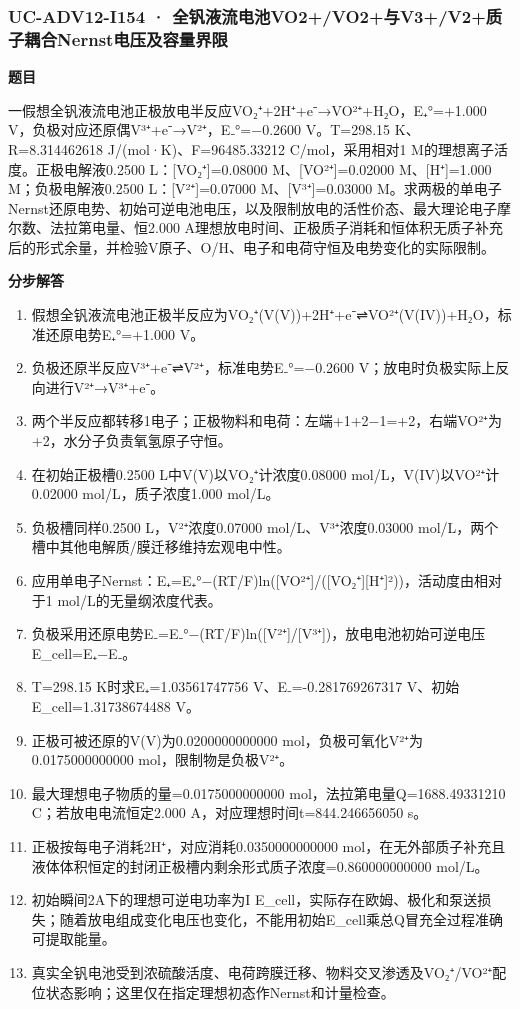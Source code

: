\documentclass[UTF8,11pt,a4paper]{ctexart}
\begin{document}
\subsubsection*{UC-ADV12-I154 · 全钒液流电池VO2+/VO2+与V3+/V2+质子耦合Nernst电压及容量界限}
\noindent\textbf{题目}\par
一假想全钒液流电池正极放电半反应VO₂⁺+2H⁺+e⁻→VO²⁺+H₂O，E₊°=+1.000 V，负极对应还原偶V³⁺+e⁻→V²⁺，E₋°=−0.2600 V。T=298.15 K、R=8.314462618 J/(mol·K)、F=96485.33212 C/mol，采用相对1 M的理想离子活度。正极电解液0.2500 L：[VO₂⁺]=0.08000 M、[VO²⁺]=0.02000 M、[H⁺]=1.000 M；负极电解液0.2500 L：[V²⁺]=0.07000 M、[V³⁺]=0.03000 M。求两极的单电子Nernst还原电势、初始可逆电池电压，以及限制放电的活性价态、最大理论电子摩尔数、法拉第电量、恒2.000 A理想放电时间、正极质子消耗和恒体积无质子补充后的形式余量，并检验V原子、O/H、电子和电荷守恒及电势变化的实际限制。\par
\medskip\noindent\textbf{分步解答}
\begin{enumerate}
\item 假想全钒液流电池正极半反应为VO₂⁺(V(V))+2H⁺+e⁻⇌VO²⁺(V(IV))+H₂O，标准还原电势E₊°=+1.000 V。
\item 负极还原半反应V³⁺+e⁻⇌V²⁺，标准电势E₋°=−0.2600 V；放电时负极实际上反向进行V²⁺→V³⁺+e⁻。
\item 两个半反应都转移1电子；正极物料和电荷：左端+1+2−1=+2，右端VO²⁺为+2，水分子负责氧氢原子守恒。
\item 在初始正极槽0.2500 L中V(V)以VO₂⁺计浓度0.08000 mol/L，V(IV)以VO²⁺计0.02000 mol/L，质子浓度1.000 mol/L。
\item 负极槽同样0.2500 L，V²⁺浓度0.07000 mol/L、V³⁺浓度0.03000 mol/L，两个槽中其他电解质/膜迁移维持宏观电中性。
\item 应用单电子Nernst：E₊=E₊°−(RT/F)ln([VO²⁺]/([VO₂⁺][H⁺]²))，活动度由相对于1 mol/L的无量纲浓度代表。
\item 负极采用还原电势E₋=E₋°−(RT/F)ln([V²⁺]/[V³⁺])，放电电池初始可逆电压E\_cell=E₊−E₋。
\item T=298.15 K时求E₊=1.03561747756 V、E₋=-0.281769267317 V、初始E\_cell=1.31738674488 V。
\item 正极可被还原的V(V)为0.0200000000000 mol，负极可氧化V²⁺为0.0175000000000 mol，限制物是负极V²⁺。
\item 最大理想电子物质的量=0.0175000000000 mol，法拉第电量Q=1688.49331210 C；若放电电流恒定2.000 A，对应理想时间t=844.246656050 s。
\item 正极按每电子消耗2H⁺，对应消耗0.0350000000000 mol，在无外部质子补充且液体体积恒定的封闭正极槽内剩余形式质子浓度=0.860000000000 mol/L。
\item 初始瞬间2A下的理想可逆电功率为I E\_cell，实际存在欧姆、极化和泵送损失；随着放电组成变化电压也变化，不能用初始E\_cell乘总Q冒充全过程准确可提取能量。
\item 真实全钒电池受到浓硫酸活度、电荷跨膜迁移、物料交叉渗透及VO₂⁺/VO²⁺配位状态影响；这里仅在指定理想初态作Nernst和计量检查。
\end{enumerate}
\end{document}
